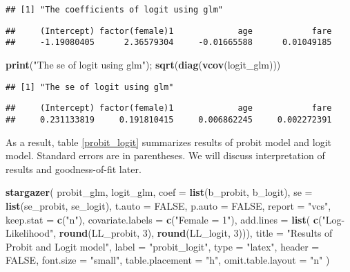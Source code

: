 \documentclass[
  12pt,
]{article}
\newenvironment{Shaded}{\begin{snugshade}}{\end{snugshade}}
\newcommand{\DataTypeTok}[1]{\textcolor[rgb]{0.13,0.29,0.53}{#1}}
\newcommand{\DecValTok}[1]{\textcolor[rgb]{0.00,0.00,0.81}{#1}}
\newcommand{\KeywordTok}[1]{\textcolor[rgb]{0.13,0.29,0.53}{\textbf{#1}}}
\newcommand{\NormalTok}[1]{#1}
\newcommand{\OtherTok}[1]{\textcolor[rgb]{0.56,0.35,0.01}{#1}}
\newcommand{\StringTok}[1]{\textcolor[rgb]{0.31,0.60,0.02}{#1}}
\begin{document}
\begin{verbatim}
## [1] "The coefficients of logit using glm"
\end{verbatim}

\begin{verbatim}
##     (Intercept) factor(female)1             age            fare 
##     -1.19080405      2.36579304     -0.01665588      0.01049185
\end{verbatim}

\begin{Shaded}
\begin{Highlighting}[]
\KeywordTok{print}\NormalTok{(}\StringTok{"The se of logit using glm"}\NormalTok{); }\KeywordTok{sqrt}\NormalTok{(}\KeywordTok{diag}\NormalTok{(}\KeywordTok{vcov}\NormalTok{(logit\_glm)))}
\end{Highlighting}
\end{Shaded}

\begin{verbatim}
## [1] "The se of logit using glm"
\end{verbatim}

\begin{verbatim}
##     (Intercept) factor(female)1             age            fare 
##     0.231133819     0.191810415     0.006862245     0.002272391
\end{verbatim}

As a result, table \ref{probit_logit} summarizes results of probit model
and logit model. Standard errors are in parentheses. We will discuss
interpretation of results and goodness-of-fit later.

\begin{Shaded}
\begin{Highlighting}[]
\KeywordTok{stargazer}\NormalTok{(}
\NormalTok{  probit\_glm, logit\_glm,}
  \DataTypeTok{coef =} \KeywordTok{list}\NormalTok{(b\_probit, b\_logit), }\DataTypeTok{se =} \KeywordTok{list}\NormalTok{(se\_probit, se\_logit),}
  \DataTypeTok{t.auto =} \OtherTok{FALSE}\NormalTok{, }\DataTypeTok{p.auto =} \OtherTok{FALSE}\NormalTok{,}
  \DataTypeTok{report =} \StringTok{"vcs"}\NormalTok{, }\DataTypeTok{keep.stat =} \KeywordTok{c}\NormalTok{(}\StringTok{"n"}\NormalTok{),}
  \DataTypeTok{covariate.labels =} \KeywordTok{c}\NormalTok{(}\StringTok{"Female = 1"}\NormalTok{),}
  \DataTypeTok{add.lines =} \KeywordTok{list}\NormalTok{(}
    \KeywordTok{c}\NormalTok{(}\StringTok{"Log{-}Likelihood"}\NormalTok{, }\KeywordTok{round}\NormalTok{(LL\_probit, }\DecValTok{3}\NormalTok{), }\KeywordTok{round}\NormalTok{(LL\_logit, }\DecValTok{3}\NormalTok{))),}
  \DataTypeTok{title =} \StringTok{"Results of Probit and Logit model"}\NormalTok{,}
  \DataTypeTok{label =} \StringTok{"probit\_logit"}\NormalTok{,}
  \DataTypeTok{type =} \StringTok{"latex"}\NormalTok{, }\DataTypeTok{header =} \OtherTok{FALSE}\NormalTok{, }\DataTypeTok{font.size =} \StringTok{"small"}\NormalTok{,}
  \DataTypeTok{table.placement =} \StringTok{"h"}\NormalTok{, }\DataTypeTok{omit.table.layout =} \StringTok{"n"}
\NormalTok{)}
\end{Highlighting}
\end{Shaded}
\end{document}
